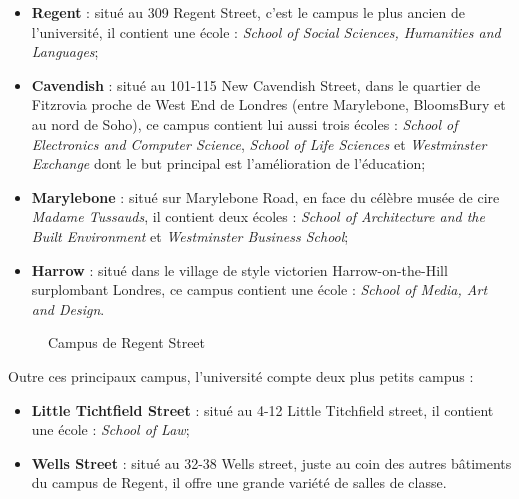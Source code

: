 \begin{itemize}
	\item \textbf{Regent} : situ\'e au 309 Regent Street, c'est le campus le plus ancien de l'universit\'e, il contient une \'ecole : 
		\textit{School of Social Sciences, Humanities and Languages};

	\item \textbf{Cavendish} : situ\'e au 101-115 New Cavendish Street, dans le quartier de Fitzrovia proche de West End de Londres (entre Marylebone, BloomsBury et au nord de Soho), ce campus contient lui aussi trois \'ecoles : 
		\textit{School of Electronics and Computer Science}, \textit{School of Life Sciences} et \textit{Westminster Exchange} dont le but principal est l'am\'elioration de l'\'education;

	\item \textbf{Marylebone} : situ\'e sur Marylebone Road, en face du c\'el\`ebre mus\'ee de cire \textit{Madame Tussauds}, il contient deux \'ecoles :
		\textit{School of Architecture and the Built Environment} et \textit{Westminster Business School};

	\item \textbf{Harrow} : situ\'e dans le village de style victorien Harrow-on-the-Hill surplombant Londres, ce campus contient une \'ecole : 
		\textit{School of Media, Art and Design}.

\end{itemize}

\begin{figure}[!ht]
	\centering
	\qquad
	\caption{Campus de Regent Street}

\end{figure}

\noindent Outre ces principaux campus, l'universit\'e compte deux plus petits campus : 

\begin{itemize}
	\item \textbf{Little Tichtfield Street} : situ\'e au 4-12 Little Titchfield street, il contient une \'ecole : 
		\textit{School of Law};
	\item \textbf{Wells Street} : situ\'e au 32-38 Wells street, juste au coin des autres b\^atiments du campus de Regent, il offre une grande vari\'et\'e de salles de classe.

\end{itemize}

